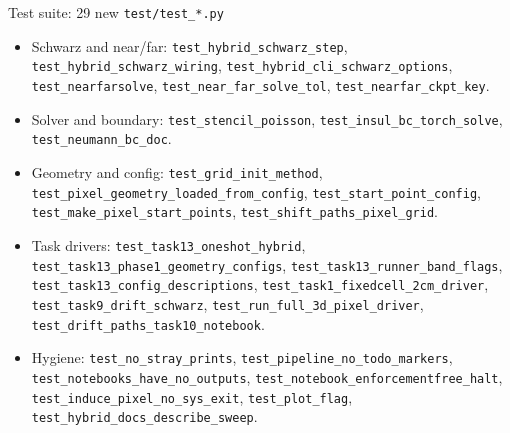 \documentclass[10pt,aspectratio=169]{beamer}
\newcommand{\ti}[1]{\texttt{\footnotesize #1}}
\begin{document}
\begin{frame}[allowframebreaks]{Test suite: 29 new \texttt{test/test\_*.py}}
  \begin{itemize}\small
  \item Schwarz and near/far: \ti{test\_hybrid\_schwarz\_step},
        \ti{test\_hybrid\_schwarz\_wiring}, \ti{test\_hybrid\_cli\_schwarz\_options},
        \ti{test\_nearfarsolve}, \ti{test\_near\_far\_solve\_tol},
        \ti{test\_nearfar\_ckpt\_key}.
  \item Solver and boundary: \ti{test\_stencil\_poisson},
        \ti{test\_insul\_bc\_torch\_solve}, \ti{test\_neumann\_bc\_doc}.
  \item Geometry and config: \ti{test\_grid\_init\_method},
        \ti{test\_pixel\_geometry\_loaded\_from\_config}, \ti{test\_start\_point\_config},
        \ti{test\_make\_pixel\_start\_points}, \ti{test\_shift\_paths\_pixel\_grid}.
  \item Task drivers: \ti{test\_task13\_oneshot\_hybrid},
        \ti{test\_task13\_phase1\_geometry\_configs},
        \ti{test\_task13\_runner\_band\_flags}, \ti{test\_task13\_config\_descriptions},
        \ti{test\_task1\_fixedcell\_2cm\_driver}, \ti{test\_task9\_drift\_schwarz},
        \ti{test\_run\_full\_3d\_pixel\_driver}, \ti{test\_drift\_paths\_task10\_notebook}.
  \item Hygiene: \ti{test\_no\_stray\_prints}, \ti{test\_pipeline\_no\_todo\_markers},
        \ti{test\_notebooks\_have\_no\_outputs},
        \ti{test\_notebook\_enforcementfree\_halt},
        \ti{test\_induce\_pixel\_no\_sys\_exit}, \ti{test\_plot\_flag},
        \ti{test\_hybrid\_docs\_describe\_sweep}.
  \end{itemize}
\end{frame}
\end{document}
